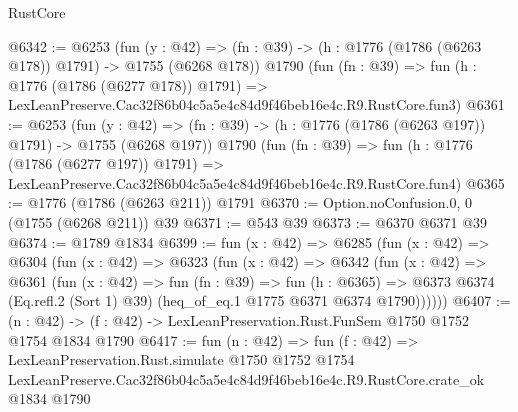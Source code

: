 \begin{lexlean}{RustCore}
\begin{coremodule}
@6342 := @6253
    (fun (y : @42) => (fn : @39) -> (h : @1776 (@1786 (@6263 @178)) @1791) -> @1755 (@6268 @178))
    @1790
    (fun (fn : @39) =>
    fun (h : @1776 (@1786 (@6277 @178)) @1791) =>
    LexLeanPreserve.Cac32f86b04c5a5e4c84d9f46beb16e4c.R9.RustCore.fun3)
@6361 := @6253
    (fun (y : @42) => (fn : @39) -> (h : @1776 (@1786 (@6263 @197)) @1791) -> @1755 (@6268 @197))
    @1790
    (fun (fn : @39) =>
    fun (h : @1776 (@1786 (@6277 @197)) @1791) =>
    LexLeanPreserve.Cac32f86b04c5a5e4c84d9f46beb16e4c.R9.RustCore.fun4)
@6365 := @1776 (@1786 (@6263 @211)) @1791
@6370 := Option.noConfusion.{0, 0} (@1755 (@6268 @211)) @39
@6371 := @543 @39
@6373 := @6370 @6371 @39
@6374 := @1789 @1834
@6399 := fun (x : @42) =>
  @6285
    (fun (x : @42) =>
    @6304
      (fun (x : @42) =>
      @6323
        (fun (x : @42) =>
        @6342
          (fun (x : @42) =>
          @6361
            (fun (x : @42) =>
            fun (fn : @39) =>
            fun (h : @6365) =>
            @6373 @6374 (Eq.refl.{2} (Sort 1) @39) (heq_of_eq.{1} @1775 @6371 @6374 @1790))))))
@6407 := (n : @42) -> (f : @42) -> LexLeanPreservation.Rust.FunSem @1750 @1752 @1754 @1834 @1790
@6417 := fun (n : @42) =>
  fun (f : @42) =>
  LexLeanPreservation.Rust.simulate
    @1750
    @1752
    @1754
    LexLeanPreserve.Cac32f86b04c5a5e4c84d9f46beb16e4c.R9.RustCore.crate_ok
    @1834
    @1790
\end{coremodule}
\end{lexlean}
